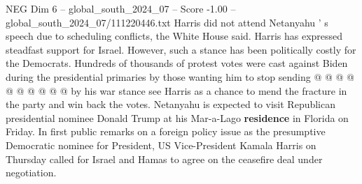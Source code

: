 \begin{textsample}{NEG Dim 6 – global\_south\_2024\_07 – Score -1.00 – global\_south\_2024\_07/111220446.txt}
Harris did not attend Netanyahu ' s speech due to scheduling conflicts, the White House said.
Harris has expressed steadfast support for Israel.
However, such a stance has been politically costly for the Democrats.
Hundreds of thousands of protest votes were cast against Biden during the presidential primaries by those wanting him to stop sending @ @ @ @ @ @ @ @ @ @ by his war stance see Harris as a chance to mend the fracture in the party and win back the votes.
Netanyahu is expected to visit Republican presidential nominee Donald Trump at his Mar-a-Lago \textbf{residence} in Florida on Friday.
In first public remarks on a foreign policy issue as the presumptive Democratic nominee for President, US Vice-President Kamala Harris on Thursday called for Israel and Hamas to agree on the ceasefire deal under negotiation.

\end{textsample}
